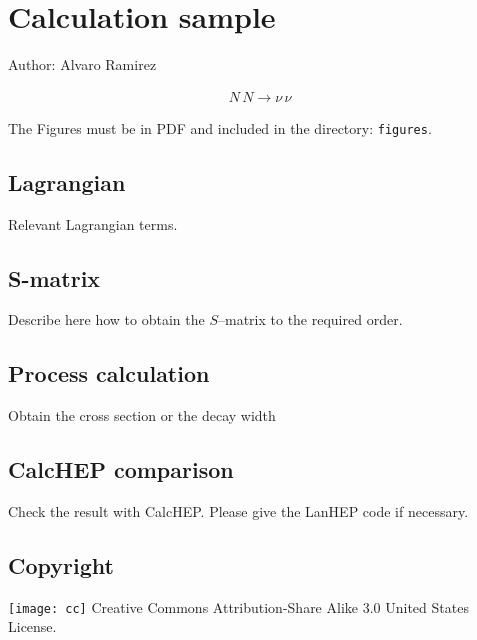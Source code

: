 \chapter{Calculation sample}

Author: Alvaro Ramirez

\begin{align}
  N\, N\to \nu\,\nu
\end{align}

The Figures must be in PDF and included in the directory: \verb|figures|.

\section{Lagrangian}
Relevant Lagrangian terms.

\section{S-matrix}
Describe here how to obtain the $S$--matrix to the required order.

\section{Process calculation}
Obtain the cross section or the decay width

\section{CalcHEP comparison}
Check the result with CalcHEP. Please give the LanHEP code if necessary.


\section{Copyright}
\texttt{[image: cc]} Creative Commons Attribution-Share Alike 3.0 United States License.




